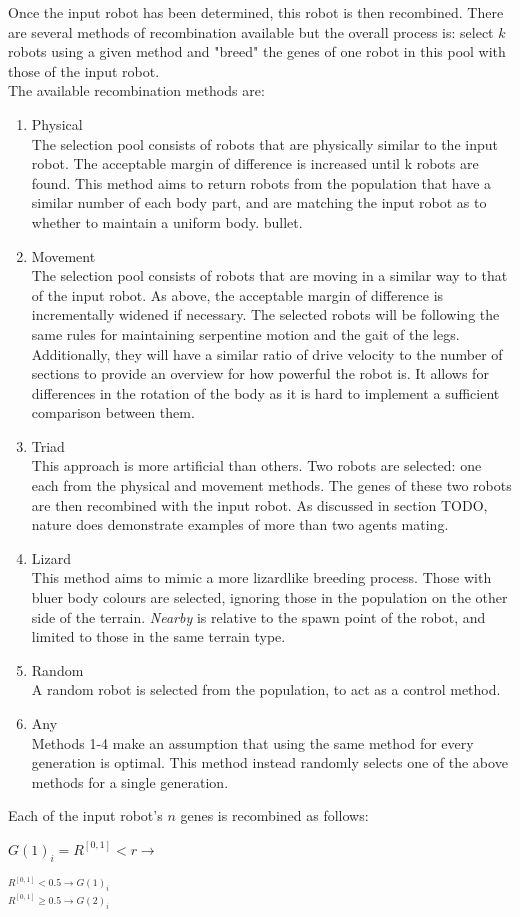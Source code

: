 \documentclass{article}
\begin{document}
Once the input robot has been determined, this robot is then recombined. There are several methods of recombination available but the overall process is: select $k$ robots using a given method and "breed" the genes of one robot in this pool with those of the input robot.\\
The available recombination methods are:
\begin{enumerate}
  \item Physical\\
The selection pool consists of robots that are physically similar to the input robot. The acceptable margin of difference is increased until k robots are found. This method aims to return robots from the population that have a similar number of each body part, and are matching the input robot as to whether to maintain a uniform body.  bullet.
  \item Movement\\
The selection pool consists of robots that are moving in a similar way to that of the input robot. As above, the acceptable margin of difference is incrementally widened if necessary. The selected robots will be following the same rules for maintaining serpentine motion and the gait of the legs. Additionally, they will have a similar ratio of drive velocity to the number of sections to provide an overview for how powerful the robot is. It allows for differences in the rotation of the body as it is hard to implement a sufficient comparison between them. 
	\item Triad\\
This approach is more artificial than others. Two robots are selected: one each from the physical and movement methods. The genes of these two robots are then recombined with the input robot. As discussed in section TODO, nature does demonstrate examples of more than two agents mating.
	\item Lizard\\
This method aims to mimic a more lizardlike breeding process. Those with bluer body colours are selected, ignoring those in the population on the other side of the terrain. \textit{Nearby} is relative to the spawn point of the robot, and limited to those in the same terrain type. \\
	\item Random\\
A random robot is selected from the population, to act as a control method.
	\item Any\\
Methods 1-4 make an assumption that using the same method for every generation is optimal. This method instead randomly selects one of the above methods for a single generation.
\end{enumerate}
Each of the input robot's $n$ genes is recombined as follows:
\begin{center}
\begin{Large}
$G(1)_{i} = R^{[0, 1]} < r \longrightarrow$ 
\begin{LARGE}
$^{R^{[0, 1]} < 0.5\longrightarrow G(1)_{i}} 
_{R^{[0, 1]} \geq 0.5 \longrightarrow G(2)_{i}}$
\end{LARGE}
\end{Large}
\end{center}
\end{document}
